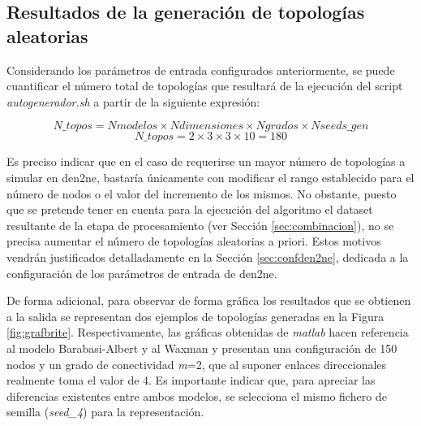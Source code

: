 \subsection{Resultados de la generación de topologías aleatorias}
\label{sec:gentopo}

Considerando los parámetros de entrada configurados anteriormente, se puede cuantificar el número total de topologías que resultará de la ejecución del script \textit{autogenerador.sh} a partir de la siguiente expresión:

    \[\textit{N\_topos} = \textit{Nmodelos} \times \textit{Ndimensiones}
    \times \textit{Ngrados} \times \textit{Nseeds\_gen}\]
    \[\textit{N\_topos} = 2 \times 3 \times 3 \times 10 = 180\]

\vspace{3mm}

Es preciso indicar que en el caso de requerirse un mayor número de topologías a simular en \gls{den2ne}, bastaría únicamente con modificar el rango establecido para el número de nodos o el valor del incremento de los mismos. No obstante, puesto que se pretende tener en cuenta para la ejecución del algoritmo el dataset resultante de la etapa de procesamiento (ver Sección \ref{sec:combinacion}), no se precisa aumentar el número de topologías aleatorias a priori. Estos motivos vendrán justificados detalladamente en la Sección \ref{sec:confden2ne}, dedicada a la configuración de los parámetros de entrada de \gls{den2ne}.

\vspace{3mm}

De forma adicional, para observar de forma gráfica los resultados que se obtienen a la salida se representan dos ejemplos de topologías generadas en la Figura \ref{fig:grafbrite}. Respectivamente, las gráficas obtenidas de \textit{matlab} hacen referencia al modelo Barabasi-Albert y al Waxman y presentan una configuración de 150 nodos y un grado de conectividad \textit{m}=2, que al suponer enlaces direccionales realmente toma el valor de 4. Es importante indicar que, para apreciar las diferencias existentes entre ambos modelos, se selecciona el mismo fichero de semilla (\textit{seed\_4}) para la representación.

\vspace{3mm}

